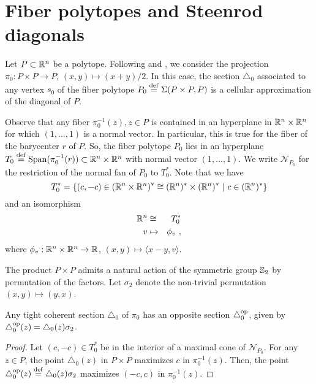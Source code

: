 
\section{Fiber polytopes and Steenrod diagonals} \label{s:fiber polytopes and Steenrod diagonals}



Let $P\subset\R^n$ be a polytope.
Following \cite{MTTV19} and \cite{GLA21}, we consider the projection $\pi_0 \colon P\times P \to P$, $(x,y)\mapsto (x+y)/2$.
In this case, the section $\triangle_0$ associated to any vertex $s_0$ of the fiber polytope $P_0 \defeq \Sigma(P\times P,P)$ is a cellular approximation of the diagonal of $P$.

Observe that any fiber $\pi_0^{-1}(z), z \in P$ is contained in an hyperplane in $\R^n\times\R^n$ for which $(1,\ldots,1)$ is a normal vector.
In particular, this is true for the fiber of the barycenter $r$ of $P$.
So, the fiber polytope $P_0$ lies in an hyperplane $T_0 \defeq \LinSpan (\pi_0^{-1}(r)) \subset \R^n \times \R^n$ with normal vector $(1,\ldots,1)$.
We write $\mathcal{N}_{P_0}$ for the restriction of the normal fan of $P_0$ to $T_0^{*}$. Note that we have $$T_0^{*}=\{(c,-c) \in (\R^n \times \R^n)^{*}\cong (\R^n)^{*}\times (\R^n)^{*} \ | \ c \in (\R^n)^{*}\}$$
and an isomorphism
\begin{eqnarray*}
    \R^n & \cong & T_0^{*} \\
    v & \mapsto & \phi_v \ ,
\end{eqnarray*}
where $\phi_v : \R^n \times \R^n \to \R$, $(x,y) \mapsto \langle x-y, v \rangle$. 

The product $P\times P$ admits a natural action of the symmetric group $\S_2$ by permutation of the factors.
Let $\sigma_2$ denote the non-trivial permutation $(x,y)\mapsto (y,x)$.

\begin{proposition}
	Any tight coherent section $\triangle_0$ of $\pi_0$ has an opposite section $\triangle_0^{\op}$, given by $\triangle_0^{\op}(z)=\triangle_0(z)\sigma_2$.
\end{proposition}

\begin{proof}
	Let $(c,-c) \in T_0^{*}$ be in the interior of a maximal cone of $\mathcal{N}_{P_0}$.
	For any $z\in P$, the point $\triangle_0(z)$ in $P\times P$ maximizes $c$ in $\pi_0^{-1}(z)$.
	Then, the point $\triangle_0^{\op}(z) \defeq \triangle_0(z)\sigma_2$ maximizes $(-c,c)$ in $\pi_0^{-1}(z)$.
\end{proof}


